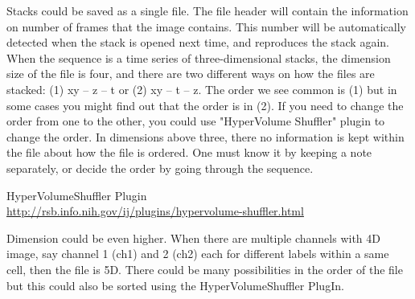 Stacks could be saved as a single file. The file header will contain the
information on number of frames that the image contains. This number
will be automatically detected when the stack is opened next time, and
reproduces the stack again. When the sequence is a time series of
three-dimensional stacks, the dimension size of the file is four, and
there are two different ways on how the files are stacked: (1) xy -- z
-- t or (2) xy -- t -- z. The order we see common is (1) but in some
cases you might find out that the order is in (2). If you need to
change the order from one to the other, you could use
"HyperVolume Shuffler" plugin to
change the order. In dimensions above three, there no information is
kept within the file about how the file is ordered. One must know it by
keeping a note separately, or decide the order by going through the
sequence. 

HyperVolumeShuffler Plugin\\
\url{http://rsb.info.nih.gov/ij/plugins/hypervolume-shuffler.html}

Dimension could be even higher. When there are multiple channels with 4D
image, say channel 1 (ch1) and 2 (ch2) each for different labels within
a same cell, then the file is 5D. There could be many possibilities in
the order of the file but this could also be sorted using the
HyperVolumeShuffler PlugIn. 


